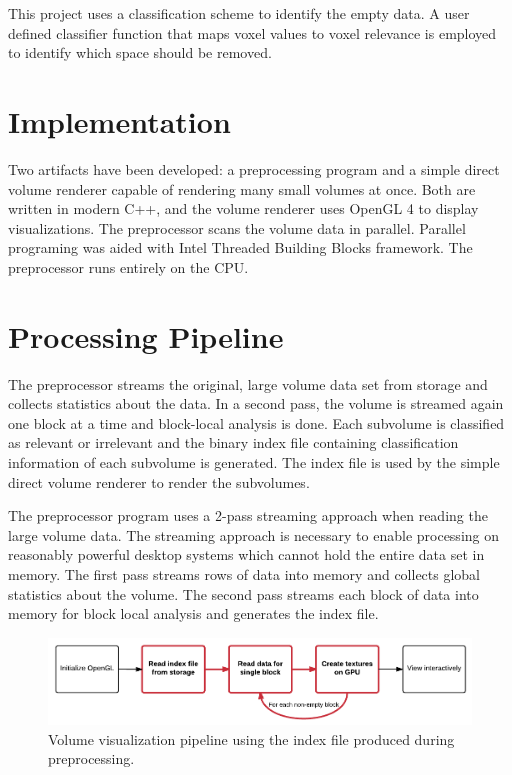 \documentclass[journal]{vgtc}                %
\begin{document}
This project uses a classification scheme to identify the empty data. A user
defined classifier function that maps voxel values to voxel relevance is
employed to identify which space should be removed. 

\section{Implementation}
Two artifacts have been developed: a preprocessing program and a simple direct
volume renderer capable of rendering many small volumes at once.  
Both are written in modern C++, and the volume
renderer uses OpenGL 4 to display visualizations. The preprocessor scans the volume
data in parallel. Parallel programing was aided with Intel Threaded Building Blocks
framework. The preprocessor runs entirely on the CPU.

\section{Processing Pipeline} 
The preprocessor streams the original, large volume data set from storage and
collects statistics about the data. In a second pass, the volume is streamed
again one block at a time and block-local analysis is done. Each subvolume is
classified as relevant or irrelevant and the binary index file containing
classification information of each subvolume is generated.  The index file is
used by the simple direct volume renderer to render the subvolumes. 

The preprocessor program uses a 2-pass streaming approach when reading the
large volume data. The streaming approach is necessary to enable processing on
reasonably powerful desktop systems which cannot hold the entire data set in
memory. The first pass streams rows of data into memory and collects global
statistics about the volume. The second pass streams each block of data into
memory for block local analysis and generates the index file.

\begin{figure}[htb]\label{fig:initToViewFlowWithPartition}
	\begin{centering}
		\includegraphics[width=\linewidth,height=0.3\textheight,keepaspectratio]{init-to-view-with-index-file}
		\caption{Volume visualization pipeline using the index file produced during preprocessing.}
	\end{centering}
\end{figure}
\end{document}
